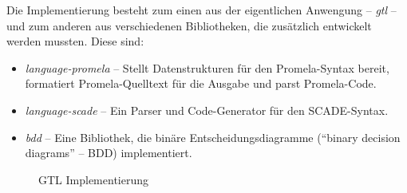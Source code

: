 Die Implementierung besteht zum einen aus der eigentlichen Anwengung -- \emph{gtl} -- und zum anderen aus verschiedenen Bibliotheken, die zusätzlich entwickelt werden mussten.
Diese sind:
\begin{itemize}
\item \emph{language-promela} -- Stellt Datenstrukturen für den Promela-Syntax bereit, formatiert Promela-Quelltext für die Ausgabe und parst Promela-Code.
\item \emph{language-scade} -- Ein Parser und Code-Generator für den SCADE-Syntax.
\item \emph{bdd} -- Eine Bibliothek, die binäre Entscheidungsdiagramme ("`binary decision diagrams"' -- BDD) implementiert.
\end{itemize}

\begin{figure}[h]
  \centering
  
  \caption{GTL Implementierung}
\end{figure}
